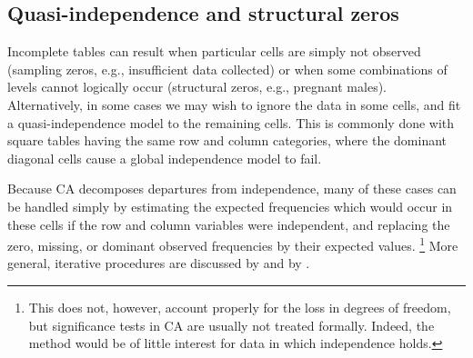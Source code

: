 \subsection{Quasi-independence and structural zeros}\label{sec:ca-quasi}
Incomplete tables can result when particular cells are simply not observed
(sampling zeros, e.g., insufficient data collected) or when some combinations of levels cannot logically occur (structural zeros, e.g., pregnant males).
Alternatively, in some cases we may wish to ignore the data in some cells,
and fit a quasi-independence model to the remaining cells. This is commonly
done with square tables having the same row and column categories,
where the dominant diagonal cells cause a global independence model to fail.

Because CA decomposes departures from independence,
many of these cases can be handled simply by estimating the expected
frequencies which would occur in these cells
if the row and column variables were
independent, and replacing the zero, missing, or dominant observed
frequencies by their expected values.%
\footnote{This does not, however, account properly for the loss in
degrees of freedom, but significance tests in CA are usually not
treated formally.
Indeed, the method would be of little interest for data in which
independence holds.}
More general, iterative procedures are discussed by \citet[\S 8.5]{Greenacre:84}
and by \citet[Ch. 3]{Heijden:87}.

